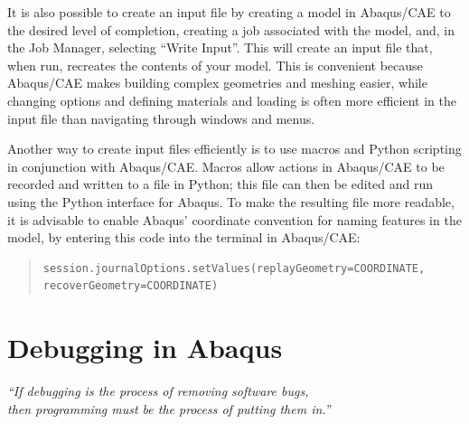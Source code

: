 \documentclass[10pt,letterpaper,oneside]{report}
\begin{document}
It is also possible to create an input file by creating a model in Abaqus/CAE to the desired level of completion, creating a job associated with the model, and, in the Job Manager, selecting ``Write Input''.  This will create an input file that, when run, recreates the contents of your model.  This is convenient because Abaqus/CAE makes building complex geometries and meshing easier, while changing options and defining materials and loading is often more efficient in the input file than navigating through windows and menus.  

Another way to create input files efficiently is to use macros and Python scripting in conjunction with Abaqus/CAE.  Macros allow actions in Abaqus/CAE to be recorded and written to a file in Python; this file can then be edited and run using the Python interface for Abaqus.  To make the resulting file more readable, it is advisable to enable Abaqus' coordinate convention for naming features in the model, by entering this code into the terminal in Abaqus/CAE:
\begin{quote} \begin{lstlisting}
session.journalOptions.setValues(replayGeometry=COORDINATE, recoverGeometry=COORDINATE)
\end{lstlisting} \end{quote}


\section{Debugging in Abaqus}

\begin{center}
\emph{“If debugging is the process of removing software bugs, \\ then programming must be the process of putting them in.”} 
\end{center}
\end{document}
